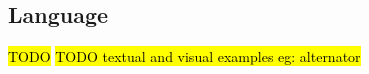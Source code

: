 \subsection{Language}
\label{sec:reo_lang}
\hl{TODO}
\hl{TODO textual and visual examples eg: alternator}
%
%
%
%
%
%
%
%
%


